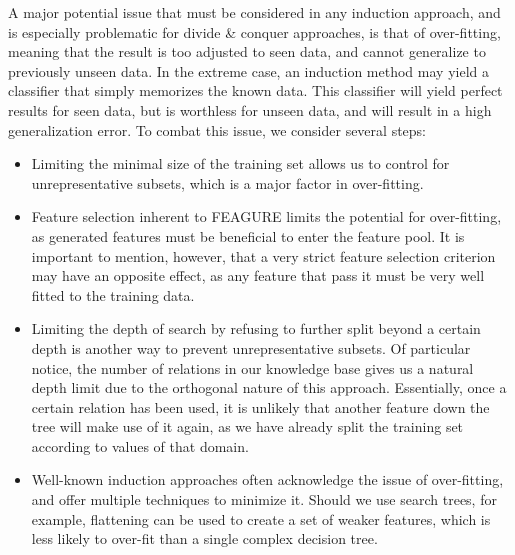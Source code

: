 \documentclass[twoside,11pt]{article}
\theoremstyle{definition}
\begin{document}
A major potential issue that must be considered in any induction approach, and is especially problematic for divide \& conquer approaches, is that of over-fitting, meaning that the result is too adjusted to seen data, and cannot generalize to previously unseen data. In the extreme case, an induction method may yield a classifier that simply memorizes the known data. This classifier will yield perfect results for seen data, but is worthless for unseen data, and will result in a high generalization error.
To combat this issue, we consider several steps:
\begin{itemize}
	\item Limiting the minimal size of the training set allows us to control for unrepresentative subsets, which is a major factor in over-fitting.
	\item Feature selection inherent to FEAGURE limits the potential for over-fitting, as generated features must be beneficial to enter the feature pool. It is important to mention, however, that a very strict feature selection criterion may have an opposite effect, as any feature that pass it must be very well fitted to the training data.
	\item Limiting the depth of search by refusing to further split beyond a certain depth is another way to prevent unrepresentative subsets. Of particular notice, the number of relations in our knowledge base gives us a natural depth limit due to the orthogonal nature of this approach. Essentially, once a certain relation has been used, it is unlikely that another feature down the tree will make use of it again, as we have already split the training set according to values of that domain. 
	\item Well-known induction approaches often acknowledge the issue of over-fitting, and offer multiple techniques to minimize it. Should we use search trees, for example, flattening can be used to create a set of weaker features, which is less likely to over-fit than a single complex decision tree.
\end{itemize}
\end{document}
